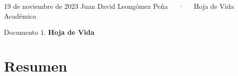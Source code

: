 \documentclass[11pt,a4paper,]{awesome-cv}
\begin{document}
\makecvheader

\makecvfooter
  {19 de noviembre de 2023}
    {Juan David Leongómez Peña~~~·~~~Hoja de Vida Académica}
  {\thepage}





\vspace{4mm}
\begin{tcolorbox}[enhanced,
        on line, 
        boxsep=4pt, left=0pt,right=0pt,top=0pt,bottom=0pt,
        colframe=white,colback=black]
  
\color{white}
\begin{LARGE}\begin{center}
Documento 1. \textbf{Hoja de Vida}
\end{center}\end{LARGE}
\end{tcolorbox}

\hypertarget{resumen}{%
\section{Resumen}\label{resumen}}
\end{document}
